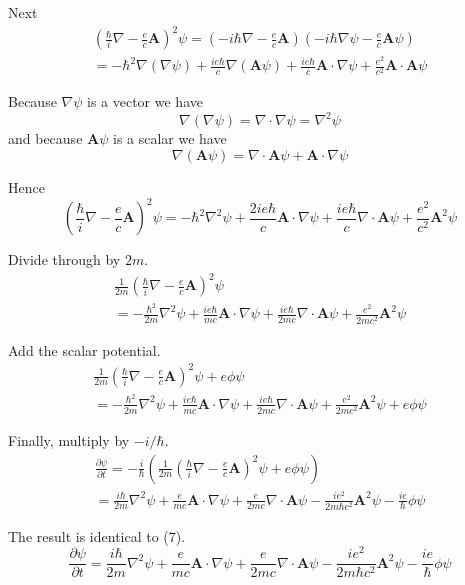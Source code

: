 \documentclass[12pt]{article}
\begin{document}
Next
\begin{multline*}
\left(\frac{\hbar}{i}\nabla-\frac{e}{c}\mathbf A\right)^2\psi
=\left(-i\hbar\nabla-\frac{e}{c}\mathbf A\right)
\left(-i\hbar\nabla\psi-\frac{e}{c}\mathbf A\psi\right)
\\
=-\hbar^2\nabla(\nabla\psi)
+\frac{ie\hbar}{c}\nabla(\mathbf A\psi)
+\frac{ie\hbar}{c}\mathbf A\cdot\nabla\psi
+\frac{e^2}{c^2}\mathbf A\cdot\mathbf A\psi
\end{multline*}

Because $\nabla\psi$ is a vector we have
\begin{equation*}
\nabla(\nabla\psi)=\nabla\cdot\nabla\psi=\nabla^2\psi
\end{equation*}
and because $\mathbf A\psi$ is a scalar we have
\begin{equation*}
\nabla(\mathbf A\psi)=\nabla\cdot\mathbf A\psi+\mathbf A\cdot\nabla\psi
\end{equation*}

Hence
\begin{equation*}
\left(\frac{\hbar}{i}\nabla-\frac{e}{c}\mathbf A\right)^2\psi
=-\hbar^2\nabla^2\psi
+\frac{2ie\hbar}{c}\mathbf A\cdot\nabla\psi
+\frac{ie\hbar}{c}\nabla\cdot\mathbf A\psi
+\frac{e^2}{c^2}\mathbf A^2\psi
\end{equation*}

Divide through by $2m$.
\begin{multline*}
\frac{1}{2m}\left(\frac{\hbar}{i}\nabla-\frac{e}{c}\mathbf A\right)^2\psi
\\
=-\frac{\hbar^2}{2m}\nabla^2\psi
+\frac{ie\hbar}{mc}\mathbf A\cdot\nabla\psi
+\frac{ie\hbar}{2mc}\nabla\cdot\mathbf A\psi
+\frac{e^2}{2mc^2}\mathbf A^2\psi
\end{multline*}

Add the scalar potential.
\begin{multline*}
\frac{1}{2m}\left(\frac{\hbar}{i}\nabla-\frac{e}{c}\mathbf A\right)^2\psi+e\phi\psi
\\
=-\frac{\hbar^2}{2m}\nabla^2\psi
+\frac{ie\hbar}{mc}\mathbf A\cdot\nabla\psi
+\frac{ie\hbar}{2mc}\nabla\cdot\mathbf A\psi
+\frac{e^2}{2mc^2}\mathbf A^2\psi
+e\phi\psi
\end{multline*}

Finally, multiply by $-i/\hbar$.
\begin{multline*}
\frac{\partial\psi}{\partial t}=
-\frac{i}{\hbar}\left(
\frac{1}{2m}\left(\frac{\hbar}{i}\nabla-\frac{e}{c}\mathbf A\right)^2\psi+e\phi\psi
\right)
\\
=\frac{i\hbar}{2m}\nabla^2\psi
+\frac{e}{mc}\mathbf A\cdot\nabla\psi
+\frac{e}{2mc}\nabla\cdot\mathbf A\psi
-\frac{ie^2}{2m\hbar c^2}\mathbf A^2\psi
-\frac{ie}{\hbar}\phi\psi
\end{multline*}

The result is identical to (7).
\begin{equation*}
\frac{\partial\psi}{\partial t}
=\frac{i\hbar}{2m}\nabla^2\psi
+\frac{e}{mc}\mathbf A\cdot\nabla\psi
+\frac{e}{2mc}\nabla\cdot\mathbf A\psi
-\frac{ie^2}{2m\hbar c^2}\mathbf A^2\psi
-\frac{ie}{\hbar}\phi\psi
\tag{7}
\end{equation*}
\end{document}
